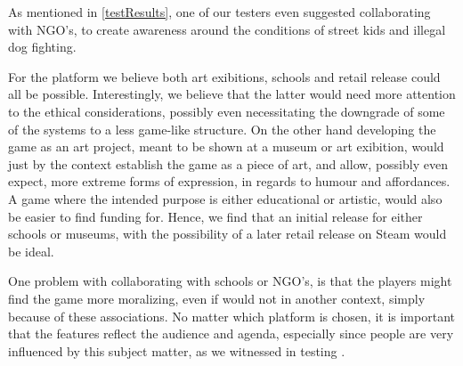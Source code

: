 As mentioned in \ref{testResults}, one of our testers even suggested collaborating with NGO's, to create awareness around the conditions of street kids and illegal dog fighting. \

For the platform we believe both art exibitions, schools and retail release could all be possible. Interestingly, we believe that the latter would need more attention to the ethical considerations, possibly even necessitating the downgrade of some of the systems to a less game-like structure. On the other hand developing the game as an art project, meant to be shown at a museum or art exibition, would just by the context establish the game as a piece of art, and allow, possibly even expect, more extreme forms of expression, in regards to humour and affordances.
A game where the intended purpose is either educational or artistic, would also be easier to find funding for. 
Hence, we find that an initial release for either schools or museums, with the possibility of a later retail release on Steam  would be ideal.\

One problem with collaborating with schools or NGO's, is that the players might find the game more moralizing, even if would not in another context, simply because of these associations. No matter which platform is chosen, it is important that the features reflect the audience and agenda, especially since people are very influenced by this subject matter, as we witnessed in testing .\